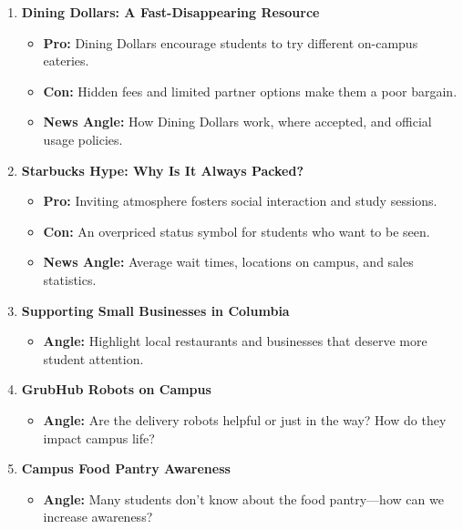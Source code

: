 \documentclass{article}
\begin{document}
\begin{enumerate}[leftmargin=*]
    \item \textbf{Dining Dollars: A Fast-Disappearing Resource}
    \begin{itemize}
        \item \textbf{Pro:} Dining Dollars encourage students to try different on-campus eateries.
        \item \textbf{Con:} Hidden fees and limited partner options make them a poor bargain.
        \item \textbf{News Angle:} How Dining Dollars work, where accepted, and official usage policies.
    \end{itemize}

    \item \textbf{Starbucks Hype: Why Is It Always Packed?}
    \begin{itemize}
        \item \textbf{Pro:} Inviting atmosphere fosters social interaction and study sessions.
        \item \textbf{Con:} An overpriced status symbol for students who want to be seen.
        \item \textbf{News Angle:} Average wait times, locations on campus, and sales statistics.
    \end{itemize}

    \item \textbf{Supporting Small Businesses in Columbia}
    \begin{itemize}
        \item \textbf{Angle:} Highlight local restaurants and businesses that deserve more student attention.
    \end{itemize}

    \item \textbf{GrubHub Robots on Campus}
    \begin{itemize}
        \item \textbf{Angle:} Are the delivery robots helpful or just in the way? How do they impact campus life?
    \end{itemize}

    \item \textbf{Campus Food Pantry Awareness}
    \begin{itemize}
        \item \textbf{Angle:} Many students don't know about the food pantry---how can we increase awareness?
    \end{itemize}
\end{enumerate}
\end{document}
